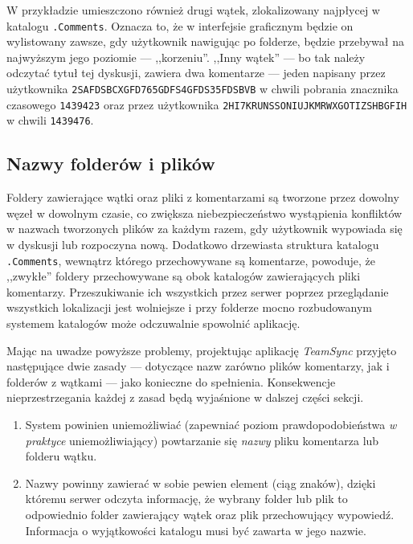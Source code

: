 W przykładzie umieszczono również drugi wątek, zlokalizowany najpłycej w katalogu \texttt{.Comments}. Oznacza to, że w interfejsie graficznym będzie on wylistowany zawsze, gdy użytkownik nawigując po folderze, będzie przebywał na najwyższym jego poziomie --- ,,korzeniu''. ,,Inny wątek'' --- bo tak należy odczytać tytuł tej dyskusji, zawiera dwa komentarze --- jeden napisany przez użytkownika \texttt{2SAFDSB\-CXGFD765\-GDFS4GFDS\-35FDSBVB} w chwili pobrania znacznika czasowego \texttt{1439423} oraz przez użytkownika \texttt{2HI7KRU\-NSSONIUJ\-KMRWXGO\-TIZSHBGFIH} w chwili \texttt{1439476}.

\subsection{Nazwy folderów i plików}

\label{filenamesf}

Foldery zawierające wątki oraz pliki z komentarzami są tworzone przez dowolny węzeł w dowolnym czasie, co zwiększa niebezpieczeństwo wystąpienia konfliktów w nazwach tworzonych plików za każdym razem, gdy użytkownik wypowiada się w dyskusji lub rozpoczyna nową. Dodatkowo drzewiasta struktura katalogu \texttt{.Comments}, wewnątrz którego przechowywane są komentarze, powoduje, że ,,zwykłe'' foldery przechowywane są obok katalogów zawierających pliki komentarzy. Przeszukiwanie ich wszystkich przez serwer poprzez przeglądanie wszystkich lokalizacji jest wolniejsze i przy folderze mocno rozbudowanym systemem katalogów może odczuwalnie spowolnić aplikację.

Mając na uwadze powyższe problemy, projektując aplikację \emph{TeamSync} przyjęto następujące dwie zasady --- dotyczące nazw zarówno plików komentarzy, jak i folderów z wątkami --- jako konieczne do spełnienia. Konsekwencje nieprzestrzegania każdej z zasad będą wyjaśnione w dalszej części sekcji.

\begin{enumerate}[noitemsep]
  \item System powinien uniemożliwiać (zapewniać poziom prawdopodobieństwa \emph{w praktyce} uniemożliwiający) powtarzanie się \emph{nazwy} pliku komentarza lub folderu wątku.
  
  \item Nazwy powinny zawierać w sobie pewien element (ciąg znaków), dzięki któremu serwer odczyta informację, że wybrany folder lub plik to odpowiednio folder zawierający wątek oraz plik przechowujący wypowiedź. Informacja o wyjątkowości katalogu musi być zawarta w jego nazwie.
\end{enumerate}

